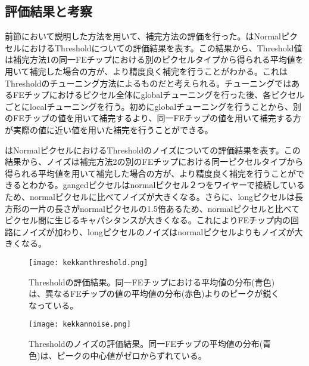 \subsection{評価結果と考察}

前節において説明した方法を用いて、補完方法の評価を行った。はNormalピクセルにおけるThresholdについての評価結果を表す。この結果から、Threshold値は補完方法1の同一FEチップにおける別のピクセルタイプから得られる平均値を用いて補完した場合の方が、より精度良く補完を行うことがわかる。これはThresholdのチューニング方法によるものだと考えられる。チューニングではあるFEチップにおけるピクセル全体にglobalチューニングを行った後、各ピクセルごとにlocalチューニングを行う。初めにglobalチューニングを行うことから、別のFEチップの値を用いて補完するより、同一FEチップの値を用いて補完する方が実際の値に近い値を用いた補完を行うことができる。

はNormalピクセルにおけるThresholdのノイズについての評価結果を表す。この結果から、ノイズは補完方法2の別のFEチップにおける同一ピクセルタイプから得られる平均値を用いて補完した場合の方が、より精度良く補完を行うことができるとわかる。gangedピクセルはnormalピクセル２つをワイヤーで接続しているため、normalピクセルに比べてノイズが大きくなる。さらに、longピクセルは長方形の一片の長さがnormalピクセルの1.5倍あるため、normalピクセルと比べてピクセル間に生じるキャパシタンスが大きくなる。これによりFEチップ内の回路にノイズが加わり、longピクセルのノイズはnormalピクセルよりもノイズが大きくなる。


\begin{figure}[tbp]
  \begin{minipage}[b]{0.5\linewidth}
    \centering
    \texttt{[image: kekkanthreshold.png]}
    \caption[Thresholdの評価結果]{Thresholdの評価結果。同一FEチップにおける平均値の分布(青色)は、異なるFEチップの値の平均値の分布(赤色)よりのピークが鋭くなっている。}
    \label{fig:kekkanthreshold}
  \end{minipage}
  \begin{minipage}[b]{0.5\linewidth}
    \centering
    \texttt{[image: kekkannoise.png]}
    \caption[Thresholdのノイズの評価結果]{Thresholdのノイズの評価結果。同一FEチップの平均値の分布(青色)は、ピークの中心値がゼロからずれている。\\}
    \label{fig:kekkannoise}
  \end{minipage}
\end{figure}


